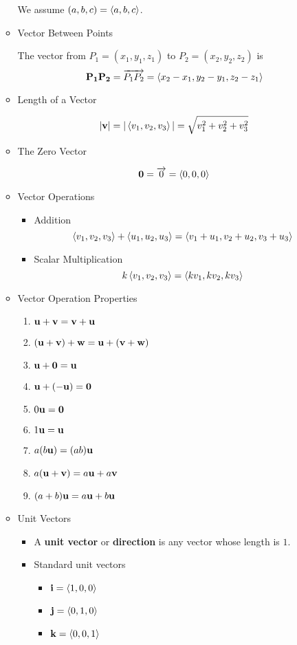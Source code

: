 \begin{itemize}
\begin{itemize}
    We assume $(a,b,c)=\left<a,b,c\right>$.

  \item Vector Between Points
  
  The vector from $P_1 = (x_1,y_1,z_1)$ to $P_2 = (x_2,y_2,z_2)$ is \[\mathbf{P_1P_2} = \overrightarrow{P_1P_2} = \left<x_2-x_1,y_2-y_1,z_2-z_1\right>\]
  
  \item Length of a Vector
  
    \[|\mathbf{v}| = |\left<v_1,v_2,v_3\right>| = \sqrt{v_1^2 + v_2^2 + v_3^2}\]
  
  \item The Zero Vector
  
  \[\mathbf{0} = \overrightarrow{0} = \left<0,0,0\right>\]
  
  \item Vector Operations
    \begin{itemize}
    \item Addition
      \[\left<v_1,v_2,v_3\right> + \left<u_1,u_2,u_3\right> = \left<v_1+u_1,v_2+u_2,v_3+u_3\right>\]
    \item Scalar Multiplication
      \[k\left<v_1,v_2,v_3\right> = \left<kv_1,kv_2,kv_3\right> \]
    \end{itemize}

  \item Vector Operation Properties
    \begin{enumerate}
    \item $\mathbf{u}+\mathbf{v} = \mathbf{v}+\mathbf{u}$
    \item $(\mathbf{u}+\mathbf{v})+\mathbf{w} = \mathbf{u}+(\mathbf{v}+\mathbf{w})$
    \item $\mathbf{u}+\mathbf{0} = \mathbf{u}$
    \item $\mathbf{u}+(-\mathbf{u}) = \mathbf{0}$
    \item $0\mathbf{u} = \mathbf{0}$
    \item $1\mathbf{u} = \mathbf{u}$
    \item $a(b\mathbf{u}) = (ab)\mathbf{u}$
    \item $a(\mathbf{u} + \mathbf{v}) = a\mathbf{u} + a\mathbf{v}$
    \item $(a+b)\mathbf{u} = a\mathbf{u} + b\mathbf{u}$
    \end{enumerate}

  \item Unit Vectors
    \begin{itemize}
    \item A \textbf{unit vector} or \textbf{direction} is any vector whose length is $1$.
    
    \item Standard unit vectors
      \begin{itemize}
      \item $\mathbf{i} = \left<1,0,0\right>$
      \item $\mathbf{j} = \left<0,1,0\right>$
      \item $\mathbf{k} = \left<0,0,1\right>$
      \end{itemize}


\end{itemize}
\end{itemize}
\end{itemize}

